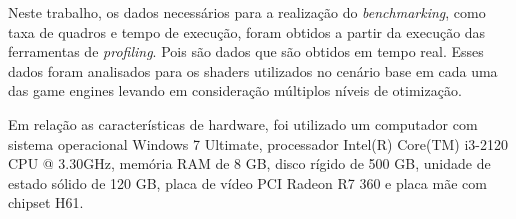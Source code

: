 Neste trabalho, os dados necessários para a realização do \textit{benchmarking}, como taxa de quadros e tempo de execução, foram obtidos a partir da execução das ferramentas de \textit{profiling}. Pois são dados que são obtidos em tempo real. Esses dados foram analisados para os shaders utilizados no cenário base em cada uma das game engines levando em consideração múltiplos níveis de otimização.

Em relação as características de hardware, foi utilizado um computador com sistema operacional Windows 7 Ultimate, processador Intel(R) Core(TM) i3-2120 CPU @ 3.30GHz, memória RAM de 8 GB, disco rígido de 500 GB, unidade de estado sólido de 120 GB, placa de vídeo PCI Radeon R7 360 e placa mãe com chipset H61.
 